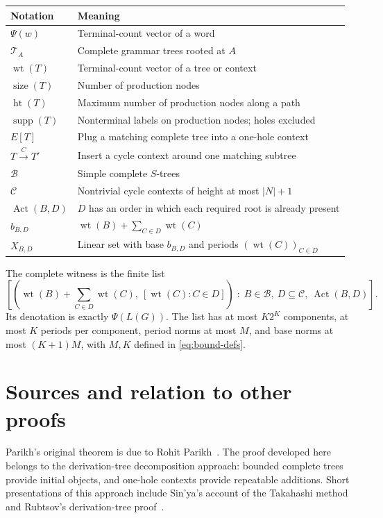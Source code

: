 \documentclass[11pt,a4paper]{article}
\numberwithin{equation}{section}
\theoremstyle{plain}
\theoremstyle{definition}
\theoremstyle{remark}
\newcommand{\wt}{\operatorname{wt}}
\newcommand{\supp}{\operatorname{supp}}
\newcommand{\treeheight}{\operatorname{ht}}
\newcommand{\sz}{\operatorname{size}}
\newcommand{\Act}{\operatorname{Act}}
\newcommand{\Trees}{\mathcal T}
\newcommand{\Bases}{\mathcal B}
\newcommand{\Cycles}{\mathcal C}
\newcommand{\ins}[1]{\xrightarrow{\;#1\;}}
\begin{document}
\begin{center}
\begin{tabular}{@{}p{34mm}p{108mm}@{}}
\toprule
Notation & Meaning\\
\midrule
$\Psi(w)$ & Terminal-count vector of a word\\
$\Trees_A$ & Complete grammar trees rooted at $A$\\
$\wt(T)$ & Terminal-count vector of a tree or context\\
$\sz(T)$ & Number of production nodes\\
$\treeheight(T)$ & Maximum number of production nodes along a path\\
$\supp(T)$ & Nonterminal labels on production nodes; holes excluded\\
$E[T]$ & Plug a matching complete tree into a one-hole context\\
$T\ins C T'$ & Insert a cycle context around one matching subtree\\
$\Bases$ & Simple complete $S$-trees\\
$\Cycles$ & Nontrivial cycle contexts of height at most $|N|+1$\\
$\Act(B,D)$ & $D$ has an order in which each required root is already present\\
$b_{B,D}$ & $\wt(B)+\sum_{C\in D}\wt(C)$\\
$X_{B,D}$ & Linear set with base $b_{B,D}$ and periods $(\wt(C))_{C\in D}$\\
\bottomrule
\end{tabular}
\end{center}

The complete witness is the finite list
\[
\left[
\left(\wt(B)+\sum_{C\in D}\wt(C),\ [\wt(C):C\in D]\right)
\;:\; B\in\Bases,\ D\subseteq\Cycles,\ \Act(B,D)
\right].
\]
Its denotation is exactly $\Psi(L(G))$. The list has at most $K2^K$ components, at most $K$ periods per component, period norms at most $M$, and base norms at most $(K+1)M$, with $M,K$ defined in \eqref{eq:bound-defs}.

\section*{Sources and relation to other proofs}

Parikh's original theorem is due to Rohit Parikh~\cite{parikh}. The proof developed here belongs to the derivation-tree decomposition approach: bounded complete trees provide initial objects, and one-hole contexts provide repeatable additions. Short presentations of this approach include Sin'ya's account of the Takahashi method~\cite{sinya} and Rubtsov's derivation-tree proof~\cite{rubtsov}.
\end{document}

